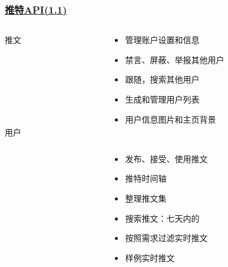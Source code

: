 \documentclass[../Postbot.tex]{subfiles}
\begin{document}
	\begin{frame}
		\frametitle{\href{https://developer.twitter.com/en/products/twitter-api}{推特API(1.1)}}
		\begin{columns}
			\begin{column}{.2\textwidth}
				\centering
				{\normalsize 推文} \\
				\hspace*{\fill} \\
				\hspace*{\fill} \\
				\hspace*{\fill} \\
				\hspace*{\fill} \\
				\hspace*{\fill} \\
				\hspace*{\fill} \\
				\hspace*{\fill} \\
				{\normalsize 用户} \\
				\hspace*{\fill} \\
				\hspace*{\fill} \\
			\end{column}

			\begin{column}{.7\textwidth}
				\begin{itemize}
					\item 管理账户设置和信息
					\item 禁言、屏蔽、举报其他用户
					\item 跟随，搜索其他用户
					\item 生成和管理用户列表
					\item 用户信息图片和主页背景
				\end{itemize}
				\hspace*{\fill} \\
				\begin{itemize}
					\item 发布、接受、使用推文
					\item 推特时间轴
					\item 整理推文集
					\item 搜索推文：七天内的
					\item 按照需求过滤实时推文
					\item 样例实时推文
				\end{itemize}
			\end{column}
			
		\end{columns}


	\end{frame}
\end{document}

